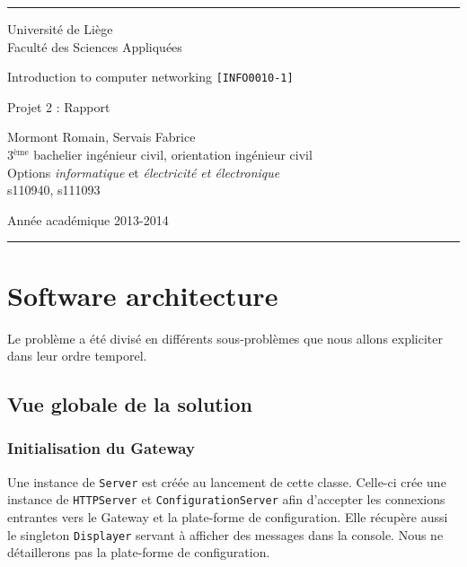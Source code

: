 \documentclass[a4paper,11pt]{article}
\begin{document}
\rule{1\linewidth}{1px}
{ \sc
\begin{center}
{\small Université de Liège}\\
{\small Faculté des Sciences Appliquées}

\end{center}

\vfill
\begin{center}

{\Huge Introduction to computer networking {\LARGE \tt [INFO0010-1]}\\}
\end{center}
\begin{center}
{\Huge Projet 2 : Rapport}
\end{center}
\begin{center}
Mormont Romain, Servais Fabrice\\
{\small 3$^{\text{ème}}$  bachelier ingénieur civil, orientation ingénieur civil}\\
{\small Options \textit{informatique} et \textit{électricité et électronique}}\\
{\small s110940, s111093}
\end{center}

\vfill
\begin{center}
Année académique 2013-2014\\
\end{center}
}
\rule{1\linewidth}{1px}
\newpage

\section{Software architecture}
Le problème a été divisé en différents sous-problèmes que nous allons expliciter dans leur ordre temporel.

	\subsection{Vue globale de la solution}

	\subsubsection{Initialisation du Gateway}
Une instance de \texttt{Server} est créée au lancement de cette classe. Celle-ci crée une instance de \texttt{HTTPServer} et \texttt{ConfigurationServer} afin d'accepter les connexions entrantes vers le Gateway et la plate-forme de configuration. Elle récupère aussi le singleton \texttt{Displayer} servant à afficher des messages dans la console. Nous ne détaillerons pas la plate-forme de configuration.
\end{document}
